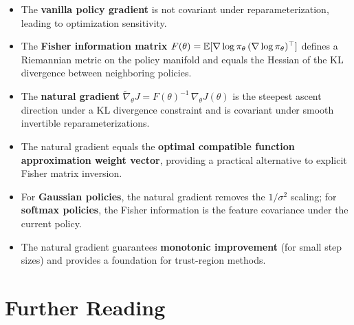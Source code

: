 \documentclass[11pt,a4paper]{article}
\begin{document}
\begin{itemize}
  \item The \textbf{vanilla policy gradient} is not covariant under
    reparameterization, leading to optimization sensitivity.

  \item The \textbf{Fisher information matrix} $F(\theta) = \mathbb{E}[\nabla
    \log \pi_\theta\, (\nabla \log \pi_\theta)^\top]$ defines a
    Riemannian metric on the policy manifold and equals the Hessian of
    the KL divergence between neighboring policies.

  \item The \textbf{natural gradient} $\tilde{\nabla}_\theta J =
    F(\theta)^{-1}\, \nabla_\theta J(\theta)$ is the steepest ascent
    direction under a KL divergence constraint and is covariant under
    smooth invertible reparameterizations.

  \item The natural gradient equals the \textbf{optimal compatible
    function approximation weight vector}, providing a practical
    alternative to explicit Fisher matrix inversion.

  \item For \textbf{Gaussian policies}, the natural gradient removes
    the $1/\sigma^2$ scaling; for \textbf{softmax policies}, the Fisher
    information is the feature covariance under the current policy.

  \item The natural gradient guarantees \textbf{monotonic improvement}
    (for small step sizes) and provides a foundation for trust-region
    methods.
\end{itemize}

\section{Further Reading}
\end{document}
